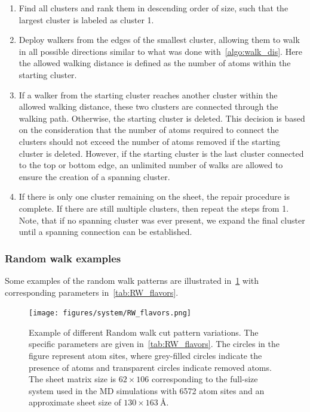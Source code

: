 \begin{enumerate}
  \item Find all clusters and rank them in descending order of size, such that the largest cluster is labeled as cluster 1.
  \item Deploy walkers from the edges of the smallest cluster, allowing them to walk in all possible directions similar to what was done with~\cref{algo:walk_dis}. Here the allowed walking distance is defined as the number of atoms within the starting cluster.
  \item If a walker from the starting cluster reaches another cluster within the allowed walking distance, these two clusters are connected through the walking path. Otherwise, the starting cluster is deleted. This decision is based on the consideration that the number of atoms required to connect the clusters should not exceed the number of atoms removed if the starting cluster is deleted. However, if the starting cluster is the last cluster connected to the top or bottom edge, an unlimited number of walks are allowed to ensure the creation of a spanning cluster.
  \item If there is only one cluster remaining on the sheet, the repair procedure is complete. If there are still multiple clusters, then repeat the steps from 1. Note, that if no spanning cluster was ever present, we expand the final cluster until a spanning connection can be established.
\end{enumerate}  
\subsubsection{Random walk examples}
Some examples of the random walk patterns are illustrated in~\cref{fig:RW_flavors} with corresponding parameters in~\cref{tab:RW_flavors}.

\newpage

\begin{figure}[H]
  \centering
  \texttt{[image: figures/system/RW\_flavors.png]}
  \caption{Example of different Random walk cut pattern variations. The specific parameters are given in~\cref{tab:RW_flavors}. The circles in the figure represent atom sites, where grey-filled circles indicate the presence of atoms and transparent circles indicate removed atoms. The sheet matrix size is $62 \times 106$ corresponding to the full-size system used in the \acrshort{MD} simulations with 6572 atom sites and an approximate sheet size of $130 \times \SI{163}{\text{Å}}$.}
  \label{fig:RW_flavors}
\end{figure}

